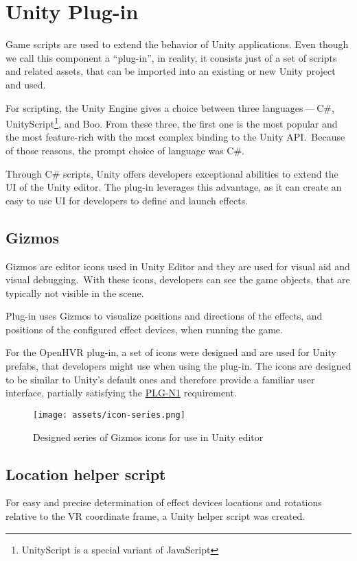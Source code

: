 \section{Unity Plug-in}
Game scripts are used to extend the behavior of Unity applications. Even though
we call this component a ``plug-in'', in reality, it consists just of a
set of scripts and related assets, that can be imported into an existing
or new Unity project and used.


For scripting, the Unity Engine gives a choice between three languages — C\#, \\
UnityScript\footnote{UnityScript is a special variant of JavaScript}, and
Boo. From these three, the first one is the most popular and the most
feature-rich with the most complex binding to the Unity API.\,\cite{unityblog}
Because of those reasons, the prompt choice of language was C\#.


Through C\# scripts, Unity offers developers exceptional abilities to extend
the UI of the Unity editor. The plug-in leverages this advantage, as it can
create an easy to use UI for developers to define and launch effects.


\subsection{Gizmos}
Gizmos are editor icons used in Unity Editor and they are used for
visual aid and visual debugging.\,\cite{gizmos}
With these icons, developers can see the game objects, that are
typically not visible in the scene.


Plug-in uses Gizmos to visualize positions and directions of the
effects, and positions of the configured effect devices, when running the game.


For the OpenHVR plug-in, a set of icons were designed and are used for
Unity prefabs, that developers might use when using the plug-in. The icons
are designed to be similar to Unity’s default ones and therefore provide
a familiar user interface, partially satisfying the 
\hyperref[plg-n1]{PLG-N1} requirement.


\begin{figure}[h]{}
    \vspace{1em}
\centering\texttt{[image: assets/icon-series.png]}
\caption{Designed series of Gizmos icons for use in Unity editor}

\end{figure}

\hypertarget{x-location-helper-script}{\subsection{Location helper script}}
For easy and precise determination of effect devices locations and rotations
relative to the VR coordinate frame, a Unity helper script was created.


